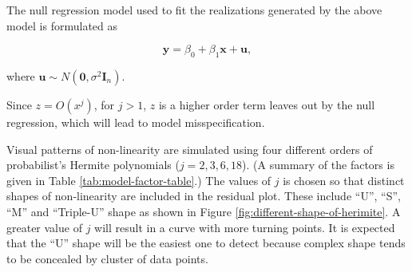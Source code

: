 \documentclass[]{interact}
\theoremstyle{plain}%
\theoremstyle{definition}
\theoremstyle{remark}
\begin{document}
The null regression model used to fit the realizations generated by the
above model is formulated as

\begin{equation} \label{eq:null-model}
\boldsymbol{y} = \beta_0 + \beta_1 \boldsymbol{x} + \boldsymbol{u},
\end{equation}

\noindent where
\(\boldsymbol{u} \sim N(\boldsymbol{0}, \sigma^2\boldsymbol{I}_n)\).

Since \(z = O(x^j)\), for \(j > 1\), \(z\) is a higher order term leaves
out by the null regression, which will lead to model misspecification.

Visual patterns of non-linearity are simulated using four different
orders of probabilist's Hermite polynomials (\(j = 2, 3, 6, 18\)). (A
summary of the factors is given in Table \ref{tab:model-factor-table}.)
The values of \(j\) is chosen so that distinct shapes of non-linearity
are included in the residual plot. These include ``U'', ``S'', ``M'' and
``Triple-U'' shape as shown in Figure
\ref{fig:different-shape-of-herimite}. A greater value of \(j\) will
result in a curve with more turning points. It is expected that the
``U'' shape will be the easiest one to detect because complex shape
tends to be concealed by cluster of data points.

\begin{table}

\caption{\label{tab:model-factor-table}Levels of the factors used in experiments I, II, III.}
\centering
{}
\end{table}
\end{document}

